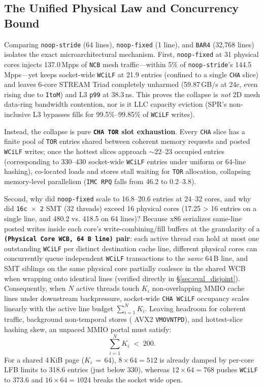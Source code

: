 \subsection{The Unified Physical Law and Concurrency Bound}
\label{sec:host_law}

Comparing \texttt{noop-stride} (64 lines), \texttt{noop-fixed} (1 line), and \texttt{BAR4} (32,768 lines) isolates the exact microarchitectural mechanism. First, \texttt{noop-fixed} at 31 physical cores injects 137.0\,Mpps of \texttt{NCB} mesh traffic---within 5\% of \texttt{noop-stride}'s 144.5\,Mpps---yet keeps socket-wide \texttt{WCiLF} at 21.9 entries (confined to a single \texttt{CHA} slice) and leaves 6-core STREAM Triad completely unharmed (59.87\,GB/s at 24c, even rising due to \texttt{ItoM}) and L3 \texttt{p99} at 38.3\,ns. This proves the collapse is \emph{not} 2D mesh data-ring bandwidth contention, nor is it LLC capacity eviction (SPR's non-inclusive L3 bypasses fills for 99.5\%--99.85\% of \texttt{WCiLF} writes).

Instead, the collapse is pure \textbf{\texttt{CHA TOR} slot exhaustion}. Every \texttt{CHA} slice has a finite pool of \texttt{TOR} entries shared between coherent memory requests and posted \texttt{WCiLF} writes; once the hottest slices approach $\sim$22--23 occupied entries (corresponding to 330--430 socket-wide \texttt{WCiLF} entries under uniform or 64-line hashing), co-located loads and stores stall waiting for \texttt{TOR} allocation, collapsing memory-level parallelism (\texttt{IMC RPQ} falls from 46.2 to 0.2--3.8).

Second, why did \texttt{noop-fixed} scale to 16.8--20.6 entries at 24--32 cores, and why did \texttt{16c\,$\times$\,2} SMT (32 threads) exceed 16 physical cores (17.25 > 16 entries on a single line, and 480.2 vs. 418.5 on 64 lines)? Because x86 serializes same-line posted writes inside each core's write-combining/fill buffers at the granularity of a \textbf{\texttt{(Physical Core WCB, 64\,B line)} pair}: each active thread can hold at most one outstanding \texttt{WCiLF} per distinct destination cache line, different physical cores can concurrently queue independent \texttt{WCiLF} transactions to the \emph{same} 64\,B line, and SMT siblings on the same physical core partially coalesce in the shared WCB when wrapping onto identical lines (verified directly in \S\ref{sec:eval_disjoint}). Consequently, when $N$ active threads touch $K_i$ non-overlapping MMIO cache lines under downstream backpressure, socket-wide \texttt{CHA WCiLF} occupancy scales linearly with the active line budget $\sum_{i=1}^{N} K_i$. Leaving headroom for coherent traffic, background non-temporal stores (\eg{} AVX2 \texttt{VMOVNTPD}), and hottest-slice hashing skew, an unpaced MMIO portal must satisfy:
\begin{equation}
  \sum_{i=1}^{N} K_i \;<\; 200.
  \label{eq:concurrency}
\end{equation}
For a shared 4\,KiB page ($K_i\,=\,64$), $8 \times 64 = 512$ is already damped by per-core LFB limits to 318.6 entries (just below 330), whereas $12 \times 64 = 768$ pushes \texttt{WCiLF} to 373.6 and $16 \times 64 = 1024$ breaks the socket wide open.
